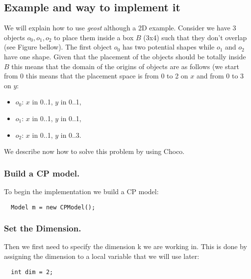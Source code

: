 \subsection{Example and way to implement it}\label{geostdescription:exampleandwaytoimplementit}\hypertarget{geostdescription:exampleandwaytoimplementit}{}

We will explain how to use \emph{geost} although a 2D example. Consider we have 3 objects $o_0, o_1, o_2$ to place them inside a box $B$ (3x4) such that they don't overlap (see Figure bellow). The first object $o_0$ has two potential shapes while $o_1$ and $o_2$ have one shape. Given that the placement of the objects should be totally inside $B$ this means that the domain of the origins of objects are as follows (we start from 0 this means that the placement space is from 0 to 2 on $x$ and from 0 to 3 on $y$:
\begin{itemize}
	\item $o_0$: $x$ in 0..1, $y$ in 0..1,
	\item $o_1$: $x$ in 0..1, $y$ in 0..1,
	\item $o_2$: $x$ in 0..1, $y$ in 0..3.
\end{itemize}


We describe now how to solve this problem by using Choco.

\subsubsection{Build a CP model.}\label{geostdescription:buildacpmodel}\hypertarget{geostdescription:buildacpmodel}{}
To begin the implementation we build a CP model:
\begin{lstlisting}
  Model m = new CPModel();
\end{lstlisting}
\subsubsection{Set the Dimension.}\label{geostdescription:setthedimension}\hypertarget{geostdescription:setthedimension}{}
Then we first need to specify the dimension k we are working in. This is done by assigning the dimension to a local variable that we will use later:
\begin{lstlisting}
  int dim = 2;
\end{lstlisting}
